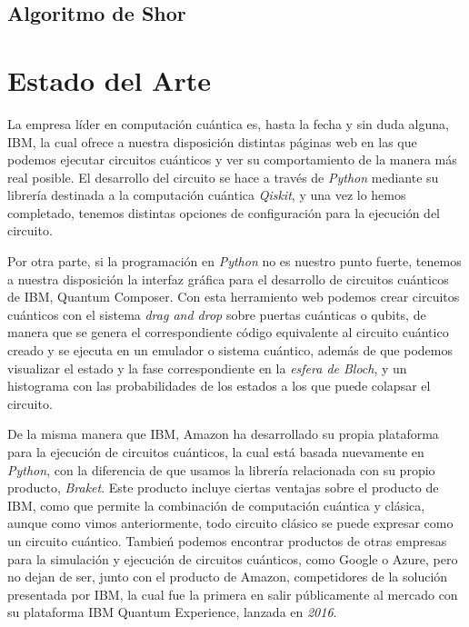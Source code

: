 \documentclass{article}
\numberwithin{equation}{section} %
\begin{document}
    \subsection{Algoritmo de Shor}

    \section{Estado del Arte}

    \vspace{5mm}

    La empresa líder en computación cuántica es, hasta la fecha y sin duda alguna, IBM, la cual ofrece a nuestra disposición distintas páginas web en las que podemos ejecutar circuitos cuánticos y ver su comportamiento de la manera más real posible. El desarrollo del circuito se hace a través de \textit{Python} mediante su librería destinada a la computación cuántica \textit{Qiskit}, y una vez lo hemos completado, tenemos distintas opciones de configuración para la ejecución del circuito.

    \vspace{5mm}

    Por otra parte, si la programación en \textit{Python} no es nuestro punto fuerte, tenemos a nuestra disposición la interfaz gráfica para el desarrollo de circuitos cuánticos de IBM, Quantum Composer. Con esta herramiento web podemos crear circuitos cuánticos con el sistema \textit{drag and drop} sobre puertas cuánticas o qubits, de manera que se genera el correspondiente código equivalente al circuito cuántico creado y se ejecuta en un emulador o sistema cuántico, además de que podemos visualizar el estado y la fase correspondiente en la \textit{esfera de Bloch}, y un histograma con las probabilidades de los estados a los que puede colapsar el circuito.
    
    \vspace{5mm}

    De la misma manera que IBM, Amazon ha desarrollado su propia plataforma para la ejecución de circuitos cuánticos, la cual está basada nuevamente en \textit{Python}, con la diferencia de que usamos la librería relacionada con su propio producto, \textit{Braket}. Este producto incluye ciertas ventajas sobre el producto de IBM, como que permite la combinación de computación cuántica y clásica, aunque como vimos anteriormente, todo circuito clásico se puede expresar como un circuito cuántico. Tambień podemos encontrar productos de otras empresas para la simulación y ejecución de circuitos cuánticos, como Google o Azure, pero no dejan de ser, junto con el producto de Amazon, competidores de la solución presentada por IBM, la cual fue la primera en salir públicamente al mercado con su plataforma IBM Quantum Experience, lanzada en \textit{2016}.
\end{document}

